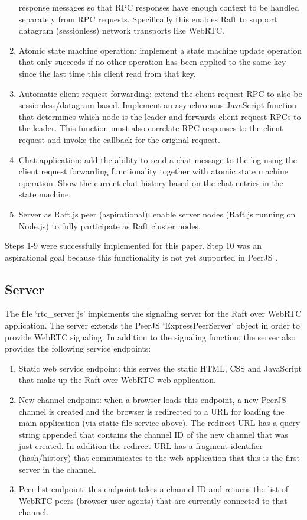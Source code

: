 \documentclass[9pt]{extarticle}
\begin{document}
\begin{multicols}{2}
\begin{enumerate}
    response messages so that RPC responses have enough context to be
    handled separately from RPC requests. Specifically this enables
    Raft to support datagram (sessionless) network transports like
    WebRTC.
\item Atomic state machine operation: implement a state machine
    update operation that only succeeds if no other operation has been
    applied to the same key since the last time this client read from
    that key.
\item Automatic client request forwarding: extend the client request
    RPC to also be sessionless/datagram based. Implement an
    asynchronous JavaScript function that determines which node is the
    leader and forwards client request RPCs to the leader. This
    function must also correlate RPC responses to the client request
    and invoke the callback for the original request.
\item Chat application: add the ability to send a chat message to the
    log using the client request forwarding functionality together
    with atomic state machine operation. Show the current chat history
    based on the chat entries in the state machine.
\item Server as Raft.js peer (aspirational): enable server nodes
    (Raft.js running on Node.js) to fully participate as Raft cluster
    nodes.
\end{enumerate}

Steps 1-9 were successfully implemented for this paper. Step 10 was an
aspirational goal because this functionality is not yet supported in
PeerJS \cite{peerjs:103}.

\subsection{Server}

The file `rtc\_server.js' implements the signaling server for the Raft
over WebRTC application. The server extends the PeerJS
`ExpressPeerServer' object in order to provide WebRTC signaling. In
addition to the signaling function, the server also provides the
following service endpoints:

\begin{enumerate}
\item Static web service endpoint: this serves the static HTML, CSS
    and JavaScript that make up the Raft over WebRTC web application.
\item New channel endpoint: when a browser loads this endpoint, a new
    PeerJS channel is created and the browser is redirected to a URL
    for loading the main application (via static file service above).
    The redirect URL has a query string appended that contains the
    channel ID of the new channel that was just created. In addition
    the redirect URL has a fragment identifier (hash/history) that
    communicates to the web application that this is the first server
    in the channel.
\item Peer list endpoint: this endpoint takes a channel ID and returns
    the list of WebRTC peers (browser user agents) that are currently
    connected to that channel.


\end{enumerate}
\end{multicols}
\end{document}
